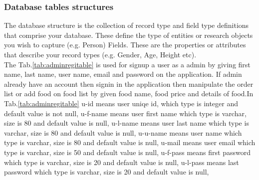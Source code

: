 \documentclass[12pt,a4paper]{article}
\newcommand\tab[1][.7cm]{\hspace*{#1}}
\begin{document}
	\subsubsection{Database tables structures}
	\tab The database structure is the collection of record type and field type definitions that comprise your database. These define the type of entities or research objects you wish to capture (e.g. Person) Fields. These are the properties or attributes that describe your record types (e.g. Gender, Age, Height etc).\\
		\tab The Tab.\ref{tab:adminregitable} is used for signup a user as a admin by giving first name, last name, user name, email and password on the application. If admin already have an account then signin in the application then manipulate the order list or add food on food list by given food name, food price and details of food.In Tab.\ref{tab:adminregitable} u-id means user uniqe id, which type is integer and default value is not null, u-f-name means user first name which type is varchar, size is 80 and default value is null, u-l-name means user last name which type is varchar, size is 80 and default value is null, u-u-name means user name which type is varchar, size is 80 and default value is null, u-mail means user email which type is varchar, size is 50 and default value is null, u-f-pass means first password which type is varchar, size is 20 and default value is null, u-l-pass means last password which type is varchar, size is 20 and default value is null, 
\end{document}

